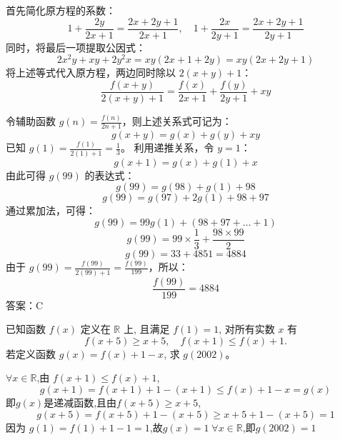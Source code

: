 \begin{questions}
\begin{solution}
首先简化原方程的系数：
\[ 1 + \frac{2y}{2x + 1} = \frac{2x + 2y + 1}{2x + 1}, \quad 1 + \frac{2x}{2y + 1} = \frac{2x + 2y + 1}{2y + 1} \]
同时，将最后一项提取公因式：
\[ 2x^2 y + xy + 2y^2 x = xy(2x + 1 + 2y) = xy(2x + 2y + 1) \]
将上述等式代入原方程，两边同时除以 $2(x + y) + 1$：
\[ \frac{f(x + y)}{2(x + y) + 1} = \frac{f(x)}{2x + 1} + \frac{f(y)}{2y + 1} + xy \]

令辅助函数 $g(n) = \frac{f(n)}{2n + 1}$，则上述关系式可记为：
\[ g(x + y) = g(x) + g(y) + xy \]
已知 $g(1) = \frac{f(1)}{2(1) + 1} = \frac{1}{3}$。
利用递推关系，令 $y = 1$：
\[ g(x + 1) = g(x) + g(1) + x \]
由此可得 $g(99)$ 的表达式：
\[ g(99) = g(98) + g(1) + 98 \]
\[ g(99) = g(97) + 2g(1) + 98 + 97 \]
通过累加法，可得：
\[ g(99) = 99g(1) + (98 + 97 + \dots + 1) \]
\[ g(99) = 99 \times \frac{1}{3} + \frac{98 \times 99}{2} \]
\[ g(99) = 33 + 4851 = 4884 \]
由于 $g(99) = \frac{f(99)}{2(99) + 1} = \frac{f(99)}{199}$，所以：
\[ \frac{f(99)}{199} = 4884 \]
答案：C
\end{solution}
    \question 已知函数 $f(x)$ 定义在 $\mathbb{R}$ 上, 且满足 $f(1)=1$, 对所有实数 $x$ 有
    \[
    f(x+5) \geq x+5, \quad f(x+1) \leq f(x)+1.
    \]
    若定义函数 $g(x) = f(x)+1 - x$, 求 $g(2002)$。     
    \begin{solution}
        $\forall x \in \mathbb{R}$,由 $f(x+1) \leq f(x)+1$,
        \[
        g(x+1)=f(x+1)+1-(x+1)\leq f(x)+1-x= g(x) 
        \]
        即$g(x)$是递减函数,且由$f(x+5)\geq x+5$,
        \[
        g(x+5)=f(x+5)+1 - (x+5) \geq x+5+1 - (x+5)=1 
        \]
        因为 $g(1)=f(1)+1-1=1$,故$g(x)=1\;\forall x \in \mathbb{R}$,即$g(2002)=1$
    \end{solution}


\end{questions}

